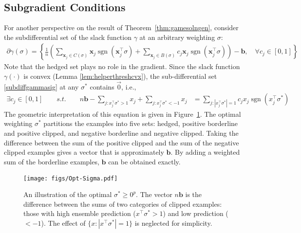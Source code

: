 \documentclass{colt2015} %
\newcommand{\vx}{\mathbf{x}}
\newcommand{\vb}{\mathbf{b}}
\DeclareMathOperator{\sgn}{sgn}
\newcommand{\abs}[1]{\left| #1 \right|}
\newcommand{\lrp}[1]{\left(#1\right)}
\renewcommand{\comment}[3]{\marginpar{\textcolor{#2}{#1: #3}}}
\newcommand{\yoav}[1]{\comment{Yoav}{blue}{#1}}
\begin{document}
\subsection{Subgradient Conditions}
For another perspective on the result of Theorem~\ref{thm:gamesolngen}, 
consider the subdifferential set of the slack function $\gamma$ at an arbitrary weighting $\sigma$:
\begin{align}
\label{subdiffgammasig}
\partial \gamma (\sigma) 
= \left\{ \frac{1}{n} \lrp{ \sum_{\vx_j \in C(\sigma)} \vx_j \sgn(\vx_j^\top \sigma) 
+ \sum_{\vx_j \in B(\sigma)} c_j \vx_j \sgn(\vx_j^\top \sigma) } - \vb
, \quad \forall c_j \in [0,1]  \right\}
\end{align}
Note that the hedged set plays no role in the gradient.
Since the slack function $\gamma(\cdot)$ is convex (Lemma \ref{lem:helperthreshcvx}), 
the sub-differential set \eqref{subdiffgammasig} at any $\sigma^*$ contains $\vec{0}$, 
i.e.,
\begin{align}
\label{gammasgexact}
\exists c_j \in [0,1] \qquad s.t. \qquad 
n \vb - \sum_{j : x_{j}^\top \sigma^* > 1} x_{j} + \sum_{j : x_{j}^\top \sigma^* < -1} x_{j} 
&= \sum_{j : \abs{x_{j}^\top \sigma^*} = 1} c_j x_{j} \sgn(x_{j}^\top \sigma^*)
\end{align}
The geometric interpretation of this equation is given in Figure~\ref{fig:optsigma}. 
The optimal weighting $\sigma^*$ partitions the examples into five sets: 
hedged, positive borderline and positive clipped, and negative borderline and negative clipped. 
Taking the difference between the sum of the positive clipped and the sum of the negative
clipped examples gives a vector that is approximately $\vb$. 
By adding a weighted sum of the borderline examples, $\vb$ can be obtained exactly.

\begin{figure}
\label{fig:optsigma}
\centering
\texttt{[image: figs/Opt-Sigma.pdf]}
\caption{\small An illustration of the optimal $\sigma^* \geq 0^p$. 
The vector $n \vb$ is the difference between the sums of two categories of clipped examples: 
those with high ensemble prediction ($x^\top \sigma^* > 1$) and low prediction ($< -1$).
The effect of $\{ x : \abs{x^\top \sigma^*} = 1\}$ is neglected for simplicity. 
}
\end{figure}

\iffalse 
\yoav{I don't think this duality, while true,  gives much insight}
\end{document}

